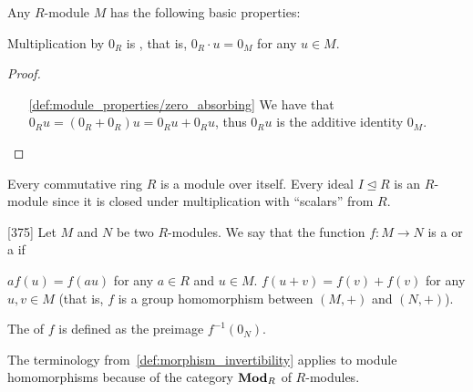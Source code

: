 \begin{proposition}\label{def:module_properties}
  Any \( R \)-module \( M \) has the following basic properties:
  \begin{defenum}
    \item\label{def:module_properties/zero_absorbing} Multiplication by \( 0_R \) is , that is, \( 0_R \cdot u = 0_M \) for any \( u \in M \).
  \end{defenum}
\end{proposition}
\begin{proof}\mbox{}
  \begin{itemize}
    \item[\ref{def:module_properties/zero_absorbing}] We have that \( 0_R u = (0_R + 0_R)u = 0_R u + 0_R u \), thus \( 0_R u \) is the additive identity \( 0_M \).
  \end{itemize}
\end{proof}

\begin{example}\label{ex:module/ideal}
  Every commutative ring \( R \) is a module over itself. Every ideal \( I \unlhd R \) is an \( R \)-module since it is closed under multiplication with \enquote{scalars} from \( R \).
\end{example}

\begin{definition}\label{def:module_homomorphism}\cite{Knapp2016BAlg}[375]
  Let \( M \) and \( N \) be two \( R \)-modules. We say that the function \( f: M \to N \) is a  or a  if
  \begin{description}
     \( a f(u) = f(a u) \) for any \( a \in R \) and \( u \in M \).
     \( f(u + v) = f(v) + f(v) \) for any \( u, v \in M \) (that is, \( f \) is a group homomorphism between \( (M, +) \) and \( (N, +) \)).
  \end{description}

  The  of \( f \) is defined as the preimage \( f^{-1}(0_N) \).

  The terminology from~\cref{def:morphism_invertibility} applies to module homomorphisms because of the category \( \operatorname{\mathbf{Mod}}_R \) of \( R \)-modules.
\end{definition}

